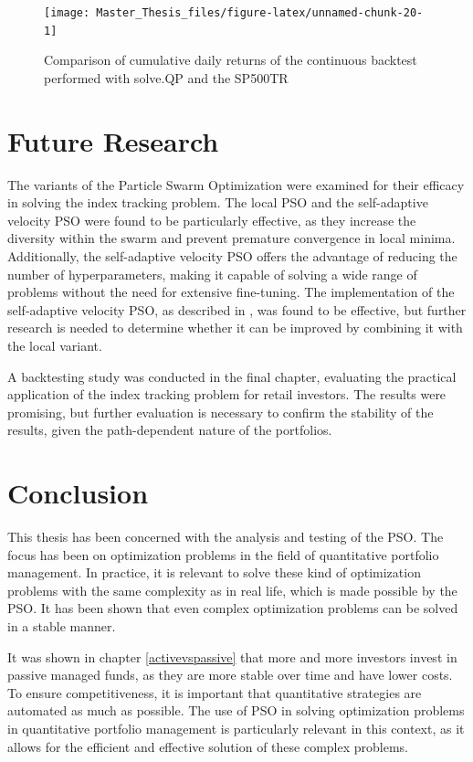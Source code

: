 \documentclass[
  oneside, a4paper, 12pt, openany]{book}
\theoremstyle{definition}
\theoremstyle{definition}
\theoremstyle{definition}
\theoremstyle{definition}
\theoremstyle{remark}
\begin{document}
\begin{figure}[H]
\texttt{[image: Master\_Thesis\_files/figure-latex/unnamed-chunk-20-1]} \caption{Comparison of cumulative daily returns of the continuous backtest performed with solve.QP and the SP500TR}\label{fig:unnamed-chunk-20}
\end{figure}

\hypertarget{future-research}{%
\chapter{Future Research}\label{future-research}}

The variants of the Particle Swarm Optimization were examined for their efficacy in solving the index tracking problem. The local PSO and the self-adaptive velocity PSO were found to be particularly effective, as they increase the diversity within the swarm and prevent premature convergence in local minima. Additionally, the self-adaptive velocity PSO offers the advantage of reducing the number of hyperparameters, making it capable of solving a wide range of problems without the need for extensive fine-tuning. The implementation of the self-adaptive velocity PSO, as described in \citep{FaYa2014}, was found to be effective, but further research is needed to determine whether it can be improved by combining it with the local variant.

A backtesting study was conducted in the final chapter, evaluating the practical application of the index tracking problem for retail investors. The results were promising, but further evaluation is necessary to confirm the stability of the results, given the path-dependent nature of the portfolios.

\hypertarget{conclusion}{%
\chapter{Conclusion}\label{conclusion}}

This thesis has been concerned with the analysis and testing of the PSO. The focus has been on optimization problems in the field of quantitative portfolio management. In practice, it is relevant to solve these kind of optimization problems with the same complexity as in real life, which is made possible by the PSO. It has been shown that even complex optimization problems can be solved in a stable manner.

It was shown in chapter \ref{activevspassive} that more and more investors invest in passive managed funds, as they are more stable over time and have lower costs. To ensure competitiveness, it is important that quantitative strategies are automated as much as possible. The use of PSO in solving optimization problems in quantitative portfolio management is particularly relevant in this context, as it allows for the efficient and effective solution of these complex problems.
\end{document}
